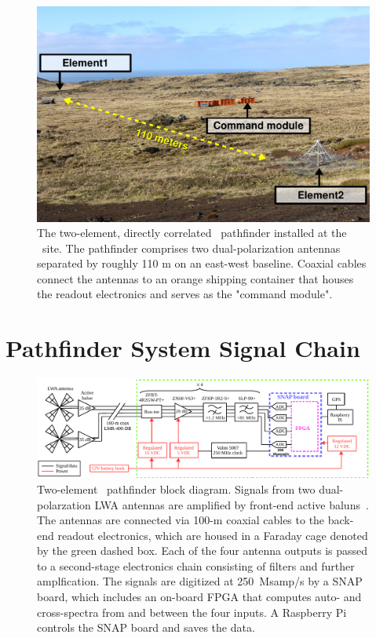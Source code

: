 \begin{figure}
	\centering
	\includegraphics[width=\linewidth]{Figures/Albatros}
	\caption{The two-element, directly correlated \albatros\ pathfinder installed at the \prizm\ site. The pathfinder comprises two dual-polarization antennas separated by roughly 110 m on an east-west baseline. Coaxial cables connect the antennas to an orange shipping container that houses the readout electronics and serves as the "command module".}
	\label{Fig:albatros2}
\end{figure}

\section{Pathfinder System Signal Chain}

\begin{figure}
	\begin{center} \includegraphics[width=\linewidth]{Figures/pathfinder_schematic.pdf}
		\caption{Two-element \albatros\ pathfinder block diagram.  Signals from two dual-polarzation LWA antennas are amplified by
			front-end active baluns~\citep{2012PASP..124.1090H}. The antennas are connected via 100-m coaxial cables to the back-end readout electronics, which are housed in a Faraday cage denoted by the green dashed box.  Each of the four antenna outputs is passed to a second-stage electronics chain consisting of filters and	further amplfication.  The signals are digitized at 250~Msamp/s by a SNAP board, which includes an on-board FPGA that computes auto- and cross-spectra from and between the four inputs.  A Raspberry Pi controls the SNAP board and saves the data. }
		\label{Fig:albatros2_schem}
	\end{center}
\end{figure}

